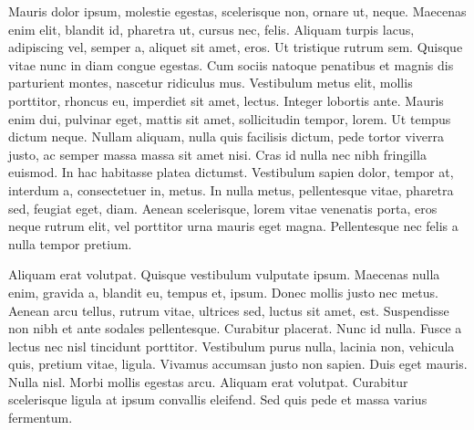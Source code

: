 \documentclass[12pt]{article}
\begin{document}
Mauris dolor ipsum, molestie egestas, scelerisque non, ornare ut, neque. Maecenas enim elit, blandit id, pharetra ut, cursus nec, felis. Aliquam turpis lacus, adipiscing vel, semper a, aliquet sit amet, eros. Ut tristique rutrum sem. Quisque vitae nunc in diam congue egestas. Cum sociis natoque penatibus et magnis dis parturient montes, nascetur ridiculus mus. Vestibulum metus elit, mollis porttitor, rhoncus eu, imperdiet sit amet, lectus. Integer lobortis ante. Mauris enim dui, pulvinar eget, mattis sit amet, sollicitudin tempor, lorem. Ut tempus dictum neque. Nullam aliquam, nulla quis facilisis dictum, pede tortor viverra justo, ac semper massa massa sit amet nisi. Cras id nulla nec nibh fringilla euismod. In hac habitasse platea dictumst. Vestibulum sapien dolor, tempor at, interdum a, consectetuer in, metus. In nulla metus, pellentesque vitae, pharetra sed, feugiat eget, diam. Aenean scelerisque, lorem vitae venenatis porta, eros neque rutrum elit, vel porttitor urna mauris eget magna. Pellentesque nec felis a nulla tempor pretium.

Aliquam erat volutpat. Quisque vestibulum vulputate ipsum. Maecenas nulla enim, gravida a, blandit eu, tempus et, ipsum. Donec mollis justo nec metus. Aenean arcu tellus, rutrum vitae, ultrices sed, luctus sit amet, est. Suspendisse non nibh et ante sodales pellentesque. Curabitur placerat. Nunc id nulla. Fusce a lectus nec nisl tincidunt porttitor. Vestibulum purus nulla, lacinia non, vehicula quis, pretium vitae, ligula. Vivamus accumsan justo non sapien. Duis eget mauris. Nulla nisl. Morbi mollis egestas arcu. Aliquam erat volutpat. Curabitur scelerisque ligula at ipsum convallis eleifend. Sed quis pede et massa varius fermentum.

\end{document}

